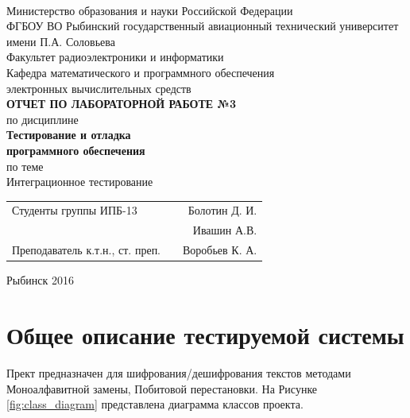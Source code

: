 \documentclass[a4paper,12pt]{article}
\begin{document}
\begin{titlepage}
\newpage

\

\begin{center}
	\large		
   	Министерство образования и науки Российской Федерации\\[0.5cm]
    	
	ФГБОУ ВО Рыбинский государственный авиационный технический университет имени П.А. Соловьева\\[1.0cm]

	Факультет радиоэлектроники и информатики\\[0.25cm]
		
	Кафедра математического и программного обеспечения\\ электронных вычислительных средств\\[1.5cm]
	
	\Large
	\textbf{\textsc{ОТЧЕТ ПО ЛАБОРАТОРНОЙ РАБОТЕ №3}}\\[0.25cm]
	по  дисциплине\\
	\textbf{Тестирование и отладка\\ программного обеспечения}\\[0.5cm]
	
	по теме\\
	Интеграционное тестирование
	
\end{center}

\vfill	
\begin{tabularx}{0.95\textwidth}{lXr}
Студенты группы ИПБ-13 			& &	Болотин Д. И.\\
								& &	Ивашин А.В. \\
Преподаватель к.т.н., ст. преп.	& & Воробьев К. А.\\
\end{tabularx}

\vspace{1.5cm}
\center Рыбинск 2016
\end{titlepage}	


\newpage
\setcounter{page}{2}

\tableofcontents

\newpage\section{Общее описание тестируемой системы}

Прект предназначен для шифрования/дешифрования текстов методами Моноалфавитной замены, Побитовой перестановки.
На Рисунке \ref{fig:class_diagram} представлена  диаграмма классов проекта.
\end{document}
